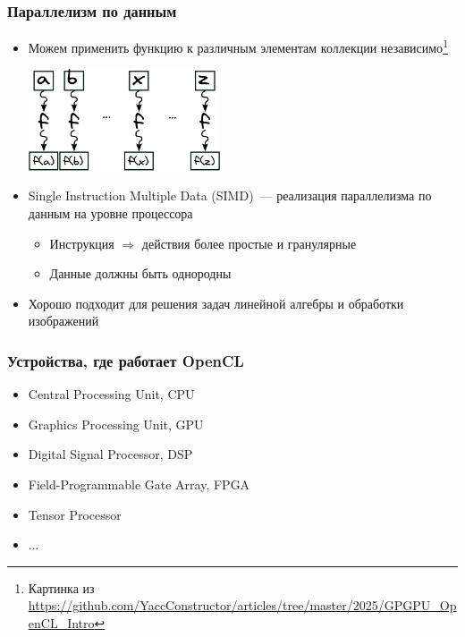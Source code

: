 \documentclass[
    aspectratio=169,
]{beamer}
\begin{document}
\begin{frame}
    \frametitle{Параллелизм по данным}

    \begin{itemize}
        \item Можем применить функцию к различным элементам коллекции независимо\footnote{Картинка из \url{https://github.com/YaccConstructor/articles/tree/master/2025/GPGPU_OpenCL_Intro}}
              \begin{center}
                  \includegraphics[height=3cm]{simd_crp.pdf}
              \end{center}
        \item Single Instruction Multiple Data (SIMD)~--- реализация параллелизма по данным на уровне процессора
              \begin{itemize}
                  \item Инструкция $\Rightarrow$ действия более простые и гранулярные
                  \item Данные должны быть однородны
              \end{itemize}
        \item Хорошо подходит для решения задач линейной алгебры и обработки изображений
    \end{itemize}

\end{frame}

\begin{frame}
    \frametitle{Устройства, где работает OpenCL}

    \begin{itemize}
        \item Central Processing Unit, CPU
        \item Graphics Processing Unit, GPU
        \item Digital Signal Processor, DSP
        \item Field-Programmable Gate Array, FPGA
        \item Tensor Processor
        \item ...
    \end{itemize}

\end{frame}
\end{document}
